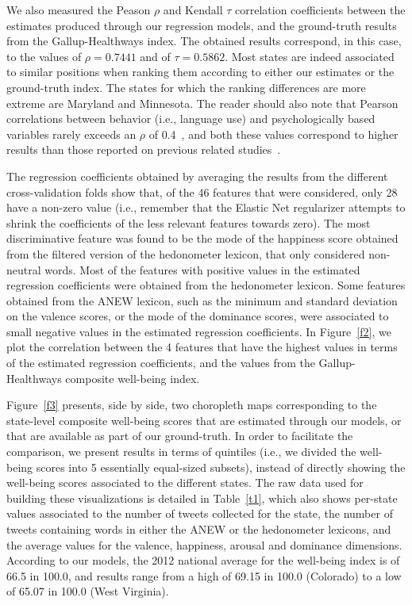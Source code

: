 \documentclass{acm_proc_article-sp}
\begin{document}
We also measured the Peason $\rho$ and Kendall $\tau$ correlation coefficients between the estimates produced through our regression models, and the ground-truth results from the Gallup-Healthways index. The obtained results correspond, in this case, to the values of $\rho=0.7441$ and of $\tau=0.5862$. Most states are indeed associated to similar positions when ranking them according to either our estimates or the ground-truth index. The states for which the ranking differences are more extreme are Maryland and Minnesota. The reader should also note that Pearson correlations between behavior (i.e., language use) and psychologically based variables rarely exceeds an $\rho$ of 0.4~\cite{Meyer2001}, and both these values correspond to higher results than those reported on previous related studies~\cite{Schwartz:2013:Tweets,Mitchell:2013:Tweets}.

The regression coefficients obtained by averaging the results from the different cross-validation folds show that, of the 46 features that were considered, only 28 have a non-zero value (i.e., remember that the Elastic Net regularizer attempts to shrink the coefficients of the less relevant features towards zero). The most discriminative feature was found to be the mode of the happiness score obtained from the filtered version of the hedonometer lexicon, that only considered non-neutral words. Most of the features with positive values in the estimated regression coefficients were obtained from the hedonometer lexicon. Some features obtained from the ANEW lexicon, such as the minimum and standard deviation on the valence scores, or the mode of the dominance scores, were associated to small negative values in the estimated regression coefficients. In Figure~\ref{f2}, we plot the correlation between the 4 features that have the highest values in terms of the estimated regression coefficients, and the values from the Gallup-Healthways composite well-being index.

Figure~\ref{f3} presents, side by side, two choropleth maps corresponding to the state-level composite well-being scores that are estimated through our models, or that are available as part of our ground-truth. In order to facilitate the comparison, we present results in terms of quintiles (i.e., we divided the well-being scores into 5 essentially equal-sized subsets), instead of directly showing the well-being scores associated to the different states. The raw data used for building these visualizations is detailed in Table~\ref{t1}, which also shows per-state values associated to the number of tweets collected for the state, the number of tweets containing words in either the ANEW or the hedonometer lexicons, and the average values for the valence, happiness, arousal and dominance dimensions. According to our models, the 2012 national average for the well-being index is of 66.5 in 100.0, and results range from a high of 69.15 in 100.0 (Colorado) to a low of 65.07 in 100.0 (West Virginia).
\end{document}
